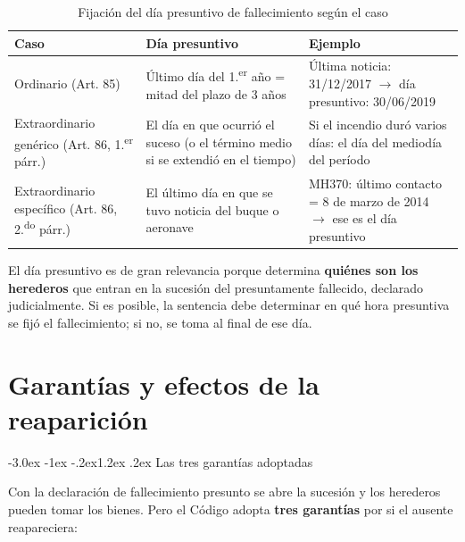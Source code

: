 \documentclass[12pt,oneside]{book}
\makeatletter
\renewcommand\section{\@startsection{section}{1}{\z@}%
  {-3.0ex \@plus -1ex \@minus -.2ex}{1.2ex \@plus .2ex}%
  {\normalfont\large\bfseries\color{acento}}}
\makeatother
\begin{document}
\begin{table}[H]
\centering
\begin{tabularx}{\textwidth}{>{\raggedright\arraybackslash}X >{\raggedright\arraybackslash}X >{\raggedright\arraybackslash}X}
\toprule
\textbf{Caso} & \textbf{Día presuntivo} & \textbf{Ejemplo} \\
\midrule
Ordinario (Art. 85) & Último día del 1.\textsuperscript{er} año = mitad del plazo de 3 años & Última noticia: 31/12/2017 $\rightarrow$ día presuntivo: 30/06/2019 \\
Extraordinario genérico (Art. 86, 1.\textsuperscript{er} párr.) & El día en que ocurrió el suceso (o el término medio si se extendió en el tiempo) & Si el incendio duró varios días: el día del mediodía del período \\
Extraordinario específico (Art. 86, 2.\textsuperscript{do} párr.) & El último día en que se tuvo noticia del buque o aeronave & MH370: último contacto = 8 de marzo de 2014 $\rightarrow$ ese es el día presuntivo \\
\bottomrule
\end{tabularx}
\caption{Fijación del día presuntivo de fallecimiento según el caso}
\end{table}

El día presuntivo es de gran relevancia porque determina
\textbf{quiénes son los herederos} que entran en la sucesión del
presuntamente fallecido, declarado judicialmente. Si es posible, la
sentencia debe determinar en qué hora presuntiva se fijó el
fallecimiento; si no, se toma al final de ese día.


\chapter{Garantías y efectos de la reaparición}
\section{Las tres garantías adoptadas}

Con la declaración de fallecimiento presunto se abre la sucesión y los
herederos pueden tomar los bienes. Pero el Código adopta \textbf{tres
garantías} por si el ausente reapareciera:
\end{document}
